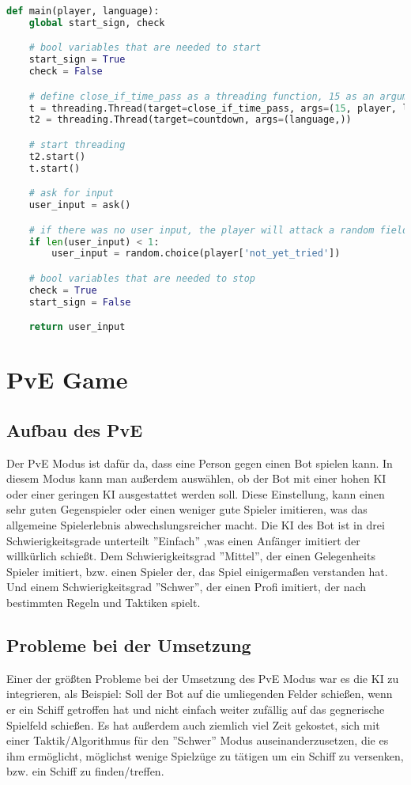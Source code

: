 \documentclass{article}
\begin{document}
\begin{lstlisting}[language=Python, caption=Main Funktion des Countdowns]
def main(player, language):
    global start_sign, check

    # bool variables that are needed to start
    start_sign = True
    check = False

    # define close_if_time_pass as a threading function, 15 as an argument
    t = threading.Thread(target=close_if_time_pass, args=(15, player, language,))
    t2 = threading.Thread(target=countdown, args=(language,))

    # start threading
    t2.start()
    t.start()

    # ask for input
    user_input = ask()

    # if there was no user input, the player will attack a random field automatically
    if len(user_input) < 1:
        user_input = random.choice(player['not_yet_tried'])

    # bool variables that are needed to stop
    check = True
    start_sign = False

    return user_input
\end{lstlisting}



\section{PvE Game}
\subsection{Aufbau des PvE}
\par
    Der PvE Modus ist dafür da, dass eine Person gegen einen Bot spielen kann. In diesem Modus kann man außerdem auswählen, ob der Bot mit einer hohen KI oder einer geringen KI ausgestattet werden soll. Diese Einstellung, kann einen sehr guten Gegenspieler oder einen weniger gute Spieler imitieren, was das allgemeine Spielerlebnis abwechslungsreicher macht. Die KI des Bot ist in drei Schwierigkeitsgrade unterteilt ''Einfach'' ,was einen Anfänger imitiert der willkürlich schießt. Dem Schwierigkeitsgrad ''Mittel'', der einen Gelegenheits Spieler imitiert, bzw. einen Spieler der, das Spiel einigermaßen verstanden hat. Und einem Schwierigkeitsgrad ''Schwer'', der einen Profi imitiert, der nach bestimmten Regeln und Taktiken spielt.
\subsection{Probleme bei der Umsetzung}
\par
    Einer der größten Probleme bei der Umsetzung des PvE Modus war es die KI zu integrieren, als Beispiel: Soll der Bot auf die umliegenden Felder schießen, wenn er ein Schiff getroffen hat und nicht einfach weiter zufällig auf das gegnerische Spielfeld schießen. Es hat außerdem auch ziemlich viel Zeit gekostet, sich mit einer Taktik/Algorithmus für den ''Schwer'' Modus auseinanderzusetzen, die es ihm ermöglicht, möglichst wenige Spielzüge zu tätigen um ein Schiff zu versenken, bzw. ein Schiff zu finden/treffen.
\end{document}
